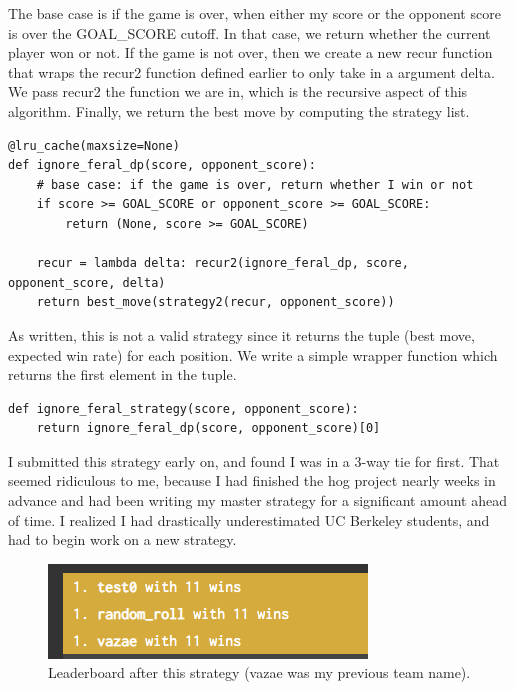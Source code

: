 \documentclass[11pt, oneside]{article}
\begin{document}
The base case is if the game is over, when either my score
or the opponent score is over the GOAL\_SCORE cutoff.
In that case, we return whether the current player won or not.
If the game is not over, then we create a new recur function
that wraps the recur2 function defined earlier to only take in a argument delta.
We pass recur2 the function we are in, 
which is the recursive aspect of this algorithm.
Finally, we return the best move by computing the strategy list.

\begin{verbatim}
@lru_cache(maxsize=None)
def ignore_feral_dp(score, opponent_score):
    # base case: if the game is over, return whether I win or not
    if score >= GOAL_SCORE or opponent_score >= GOAL_SCORE:
        return (None, score >= GOAL_SCORE)

    recur = lambda delta: recur2(ignore_feral_dp, score, opponent_score, delta)
    return best_move(strategy2(recur, opponent_score))
\end{verbatim} 

As written, this is not a valid strategy since it returns 
the tuple (best move, expected win rate) for each position.
We write a simple wrapper function which returns the first element in the tuple.

\begin{verbatim}
def ignore_feral_strategy(score, opponent_score):
    return ignore_feral_dp(score, opponent_score)[0]
\end{verbatim} 

I submitted this strategy early on, and found I was in a 3-way tie for first.
That seemed ridiculous to me, because I had finished the hog project 
nearly weeks in advance and had been writing my master strategy for a significant
amount ahead of time. I realized I had drastically underestimated UC Berkeley students,
and had to begin work on a new strategy.

\begin{figure}[h!]
    \centering
    \includegraphics[scale=0.75]{tied_first.png}
    \caption{Leaderboard after this strategy (vazae was my previous team name).}
\end{figure}
\end{document}
